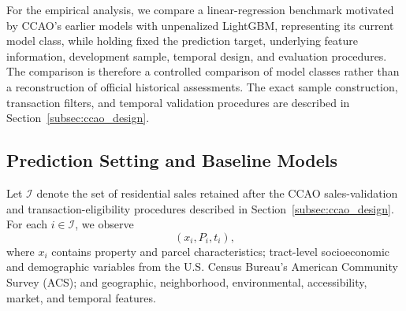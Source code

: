 \documentclass[10pt]{article}
\theoremstyle{definition}
\newcommand{\1}{\mathbf{1}}
\begin{document}

{For the empirical analysis, we compare a linear-regression benchmark motivated by CCAO's earlier models with unpenalized LightGBM, representing its current model class, while holding fixed the prediction target, underlying feature information, development sample, temporal design, and evaluation procedures.}
The comparison is therefore a controlled comparison of model classes rather than a reconstruction of official historical assessments. The exact sample construction, transaction filters, and temporal validation procedures are described in Section~\ref{subsec:ccao_design}.


\subsection{Prediction Setting and Baseline Models}
\label{subsec:baseline_models}

Let $\mathcal{I}$ denote the set of residential sales retained after the CCAO sales-validation and transaction-eligibility procedures described in Section~\ref{subsec:ccao_design}. For each $i\in\mathcal{I}$, we observe
\[
(x_i,P_i,t_i),
\]
where $x_i$ contains property and parcel characteristics; tract-level socioeconomic and demographic variables from the U.S. Census Bureau's American Community Survey (ACS); and geographic, neighborhood, environmental, accessibility, market, and temporal features.


\end{document}
